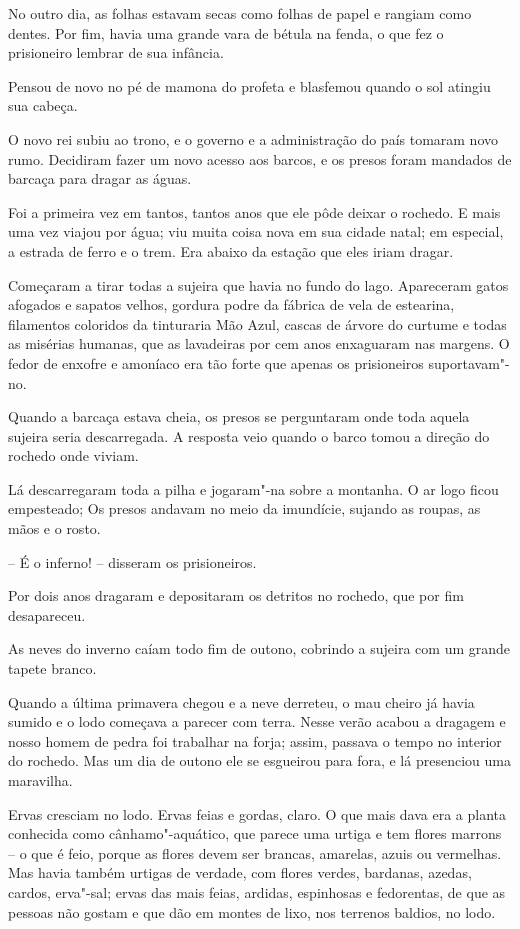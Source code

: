No outro dia, as folhas estavam secas como folhas de papel e rangiam
como dentes. Por fim, havia uma grande vara de bétula na fenda, o que
fez o prisioneiro lembrar de sua infância.

Pensou de novo no pé de mamona do profeta e blasfemou quando o sol
atingiu sua cabeça.
\asterisc

O novo rei subiu ao trono, e o governo e a administração do país tomaram
novo rumo. Decidiram fazer um novo acesso aos barcos, e os presos foram
mandados de barcaça para dragar as águas.

Foi a primeira vez em tantos, tantos anos que ele pôde deixar o rochedo.
E mais uma vez viajou por água; viu muita coisa nova em sua cidade
natal; em especial, a estrada de ferro e o trem. Era abaixo da estação
que eles iriam dragar.

Começaram a tirar todas a sujeira que havia no fundo do lago. Apareceram
gatos afogados e sapatos velhos, gordura podre da fábrica de vela de
estearina, filamentos coloridos da tinturaria Mão Azul, cascas de
árvore do curtume e todas as misérias humanas, que as lavadeiras por
cem anos enxaguaram nas margens. O fedor de enxofre e amoníaco era tão
forte que apenas os prisioneiros suportavam"-no.

Quando a barcaça estava cheia, os presos se perguntaram onde toda aquela
sujeira seria descarregada. A resposta veio quando o barco tomou a
direção do rochedo onde viviam.

Lá descarregaram toda a pilha e jogaram"-na sobre a montanha. O ar logo
ficou empesteado; Os presos andavam no meio da imundície, sujando as
roupas, as mãos e o rosto.

-- É o inferno! -- disseram os prisioneiros.

Por dois anos dragaram e depositaram os detritos no rochedo, que por fim
desapareceu.

As neves do inverno caíam todo fim de outono, cobrindo a sujeira com um
grande tapete branco.

Quando a última primavera chegou e a neve derreteu, o mau cheiro já
havia sumido e o lodo começava a parecer com terra. Nesse verão acabou
a dragagem e nosso homem de pedra foi trabalhar na forja; assim,
passava o tempo no interior do rochedo. Mas um dia de outono ele se
esgueirou para fora, e lá presenciou uma maravilha.

Ervas cresciam no lodo. Ervas feias e gordas, claro. O que mais dava era
a planta conhecida como cânhamo"-aquático, que parece uma urtiga e tem
flores marrons -- o que é feio, porque as flores devem ser brancas,
amarelas, azuis ou vermelhas. Mas havia também urtigas de verdade, com
flores verdes, bardanas, azedas, cardos, erva"-sal; ervas das mais
feias, ardidas, espinhosas e fedorentas, de que as pessoas não gostam e
que dão em montes de lixo, nos terrenos baldios, no lodo.

